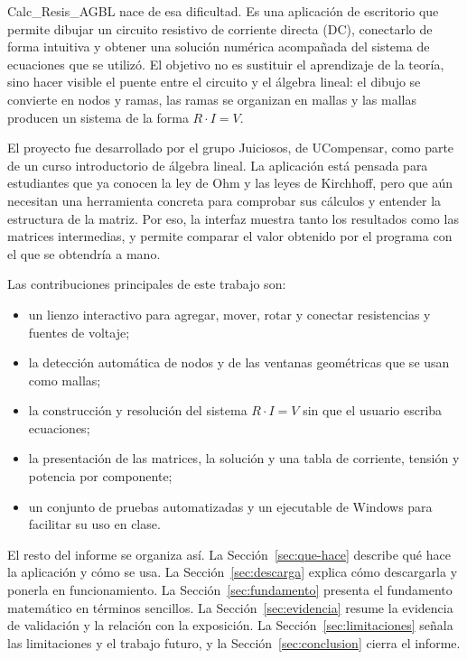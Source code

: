 \documentclass[journal]{IEEEtran}
\begin{document}
Calc\_Resis\_AGBL nace de esa dificultad. Es una aplicación de escritorio que permite dibujar un circuito resistivo de corriente directa (DC), conectarlo de forma intuitiva y obtener una solución numérica acompañada del sistema de ecuaciones que se utilizó. El objetivo no es sustituir el aprendizaje de la teoría, sino hacer visible el puente entre el circuito y el álgebra lineal: el dibujo se convierte en nodos y ramas, las ramas se organizan en mallas y las mallas producen un sistema de la forma $R \cdot I = V$.

El proyecto fue desarrollado por el grupo Juiciosos, de UCompensar, como parte de un curso introductorio de álgebra lineal. La aplicación está pensada para estudiantes que ya conocen la ley de Ohm y las leyes de Kirchhoff, pero que aún necesitan una herramienta concreta para comprobar sus cálculos y entender la estructura de la matriz. Por eso, la interfaz muestra tanto los resultados como las matrices intermedias, y permite comparar el valor obtenido por el programa con el que se obtendría a mano.

Las contribuciones principales de este trabajo son:
\begin{itemize}
  \item un lienzo interactivo para agregar, mover, rotar y conectar resistencias y fuentes de voltaje;
  \item la detección automática de nodos y de las ventanas geométricas que se usan como mallas;
  \item la construcción y resolución del sistema $R \cdot I = V$ sin que el usuario escriba ecuaciones;
  \item la presentación de las matrices, la solución y una tabla de corriente, tensión y potencia por componente;
  \item un conjunto de pruebas automatizadas y un ejecutable de Windows para facilitar su uso en clase.
\end{itemize}

El resto del informe se organiza así. La Sección~\ref{sec:que-hace} describe qué hace la aplicación y cómo se usa. La Sección~\ref{sec:descarga} explica cómo descargarla y ponerla en funcionamiento. La Sección~\ref{sec:fundamento} presenta el fundamento matemático en términos sencillos. La Sección~\ref{sec:evidencia} resume la evidencia de validación y la relación con la exposición. La Sección~\ref{sec:limitaciones} señala las limitaciones y el trabajo futuro, y la Sección~\ref{sec:conclusion} cierra el informe.

\end{document}
